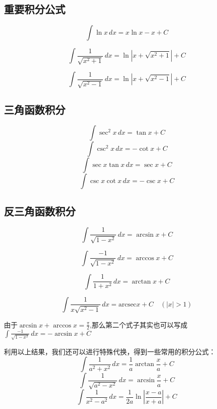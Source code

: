 \subsection*{重要积分公式}
\[
\int \ln x \, dx = x \ln x - x + C
\]

\begin{equation*}
    \boxed{
    \int \frac{1}{\sqrt{x^2 + 1}} \, dx = \ln|x + \sqrt{x^2 + 1}| + C
    }
\end{equation*}

\begin{equation*}
    \boxed{
    \int \frac{1}{\sqrt{x^2 - 1}} \, dx = \ln|x + \sqrt{x^2 - 1}| + C
    }
\end{equation*}

\subsection*{三角函数积分}
\[
\int \sec^2 x \, dx = \tan x + C
\]
\[
\int \csc^2 x \, dx = -\cot x + C
\]
\[
\int \sec x \tan x \, dx = \sec x + C
\]
\[
\int \csc x \cot x \, dx = -\csc x + C
\]

\subsection*{反三角函数积分}
\[
\int \frac{1}{\sqrt{1 - x^2}} \, dx = \arcsin x + C
\]

\[
\int \frac{-1}{\sqrt{1 - x^2}} \, dx = \arccos x + C
\]

\[
\int \frac{1}{1 + x^2} \, dx = \arctan x + C
\]

\[
\int \frac{1}{x \sqrt{x^2 - 1}} \, dx = \mathrm{arcsec} x + C \quad (|x| > 1)
\]

\vspace{3mm}
\begin{remark}
    由于$\arcsin x + \arccos x =\frac{\pi}{2}$,那么第二个式子其实也可以写成$\int \frac{-1}{\sqrt{1 - x^2}} \, dx =  - \arcsin x + C$
\end{remark}
\vspace{5mm}
\begin{note}
    利用以上结果，我们还可以进行特殊代换，得到一些常用的积分公式：
    \[
    \int \frac{1}{a^2 + x^2} \, dx = \frac{1}{a} \arctan\frac{x}{a} + C
    \]
    \[
    \int \frac{1}{\sqrt{a^2 - x^2}} \, dx = \arcsin\frac{x}{a} + C
    \]
    \[
    \int \frac{1}{x^2 - a^2} \, dx = \frac{1}{2a} \ln\left|\frac{x - a}{x + a}\right| + C
    \]
\end{note}






